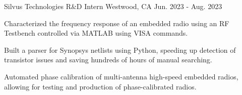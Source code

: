   \cventry
    {Silvus Technologies} %
    {R\&D Intern} %
    {Westwood, CA} %
    {Jun. 2023 - Aug. 2023} %
    {
      \begin{cvitems} %
        \item {
        Characterized the frequency response of an embedded radio using an RF Testbench controlled via MATLAB using VISA commands.
        }
        \item {
        Built a parser for Synopsys netlists using Python, speeding up detection of transistor issues and saving hundreds of hours of manual searching.
        }
        \item {
        Automated phase calibration of multi-antenna high-speed embedded radios, allowing for testing and production of phase-calibrated radios.
        }
      \end{cvitems}
    }
